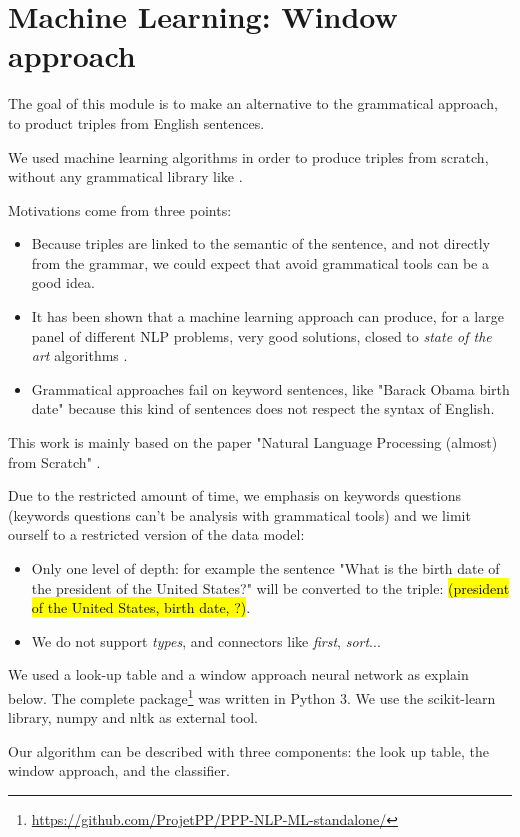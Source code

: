 \section{Machine Learning: Window approach}
\label{mlwindow}

The goal of this module is to make an alternative to the grammatical approach, to product triples from English sentences.

We used machine learning algorithms in order to produce triples from scratch, without any grammatical library like \Stanford.


Motivations come from three points:
\begin{itemize}
\item Because triples are linked to the semantic of the sentence, and not directly from the grammar, we could expect that avoid grammatical tools can be a good idea.
\item It has been shown that a machine learning approach can produce, for a large panel of different NLP problems, very good solutions, closed to \textit{state of the art} algorithms \cite{collobert}.
\item Grammatical approaches fail on keyword sentences, like "Barack Obama birth date" because this kind of sentences does not respect the syntax of English.
\end{itemize}

This work is mainly based on the paper "Natural Language Processing (almost) from Scratch" \cite{collobert}.

Due to the restricted amount of time, we emphasis on keywords questions (keywords questions can't be analysis with grammatical tools) and we limit ourself to a restricted version of the data model:
\begin{itemize}
\item Only one level of depth: for example the sentence "What is the birth date of the president of the United States?" will be converted to the triple: \hl{(president of the United States, birth date, ?)}. 
\item We do not support \textit{types}, and connectors like \textit{first}, \textit{sort}...
\end{itemize}
We used a look-up table and a window approach neural network as explain below. The complete package\footnote{\url{https://github.com/ProjetPP/PPP-NLP-ML-standalone/}} was written in Python 3. We use the scikit-learn library, numpy and nltk as external tool.

Our algorithm can be described with three components: the look up table, the window approach, and the classifier.

